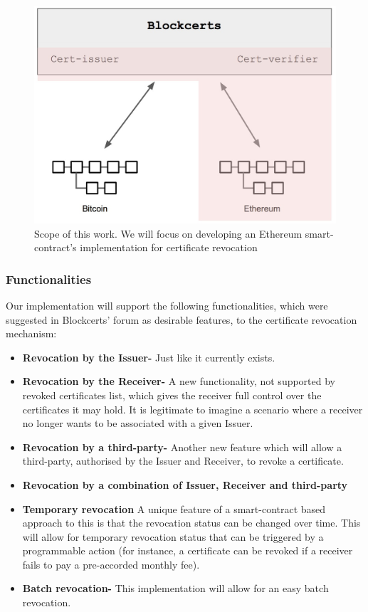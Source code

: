 \documentclass[llncsdoc]{llncs}
\begin{document}
\begin{figure}
  \includegraphics[width=\linewidth]{figures/arch.jpg}
  \caption{Scope of this work. We will focus on developing an Ethereum smart-contract's implementation for certificate revocation}
  \label{fig:scope}
\end{figure}
\subsubsection{Functionalities}
Our implementation will support the following functionalities, which were suggested in  Blockcerts' forum as desirable features, to the certificate revocation mechanism:
\begin{itemize}
    \item \textbf{Revocation by the Issuer-} Just like it currently exists.
    \item \textbf{Revocation by the Receiver-} A new functionality, not supported by revoked certificates list, which gives the receiver full control over the certificates it may hold. It is legitimate to imagine a scenario where a receiver no longer wants to be associated with a given Issuer.
    \item \textbf{Revocation by a third-party-} Another new feature which will allow a third-party, authorised by the Issuer and Receiver, to revoke a certificate.
    \item \textbf{Revocation by a combination of Issuer, Receiver and third-party}
    \item \textbf{Temporary revocation} A unique feature of a smart-contract based approach to this is that the revocation status can be changed over time. This will allow for temporary revocation status that can be triggered by a programmable action (for instance, a certificate can be revoked if a receiver fails to pay a pre-accorded monthly fee).
    \item \textbf{Batch revocation-} This implementation will allow for an easy batch revocation.
\end{itemize}
\end{document}
